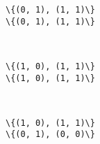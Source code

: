 \documentclass[11pt]{article}
\begin{document}
    \begin{Verbatim}[commandchars=\\\{\}]
\{(0, 1), (1, 1)\}
\{(0, 1), (1, 1)\}

    \end{Verbatim}

    \begin{center}
    \end{center}
    { \hspace*{\fill} \\}
    
    \begin{Verbatim}[commandchars=\\\{\}]
\{(1, 0), (1, 1)\}
\{(1, 0), (1, 1)\}

    \end{Verbatim}

    \begin{center}
    \end{center}
    { \hspace*{\fill} \\}
    
    \begin{Verbatim}[commandchars=\\\{\}]
\{(1, 0), (1, 1)\}
\{(0, 1), (0, 0)\}

    \end{Verbatim}

    \begin{center}
    \end{center}
    { \hspace*{\fill} \\}
    

    
    
    
    
\end{document}
